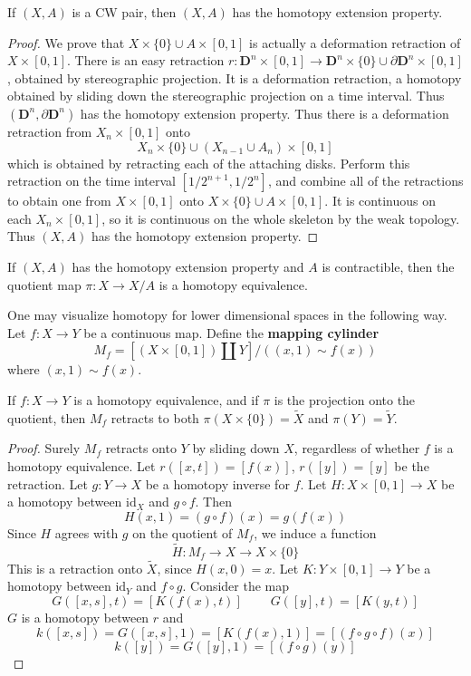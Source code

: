 \begin{theorem}
    If $(X,A)$ is a CW pair, then $(X,A)$ has the homotopy extension property.
\end{theorem}
\begin{proof}
    We prove that $X \times \{ 0 \} \cup A \times [0,1]$ is actually a deformation retraction of $X \times [0,1]$. There is an easy retraction $r: \mathbf{D}^n \times [0,1] \to \mathbf{D}^n \times \{ 0 \} \cup \partial \mathbf{D}^n \times [0,1]$, obtained by stereographic projection. It is a deformation retraction, a homotopy obtained by sliding down the stereographic projection on a time interval. Thus $(\mathbf{D}^n, \partial \mathbf{D}^n)$ has the homotopy extension property. Thus there is a deformation retraction from $X_n \times [0,1]$ onto
    \[ X_n \times \{ 0 \} \cup (X_{n-1} \cup A_n) \times [0,1] \]
    which is obtained by retracting each of the attaching disks. Perform this retraction on the time interval $[1/2^{n+1}, 1/2^n]$, and combine all of the retractions to obtain one from $X \times [0,1]$ onto $X \times \{ 0 \} \cup A \times [0,1]$. It is continuous on each $X_n \times [0,1]$, so it is continuous on the whole skeleton by the weak topology. Thus $(X, A)$ has the homotopy extension property.
\end{proof}

\begin{theorem}
    If $(X,A)$ has the homotopy extension property and $A$ is contractible, then the quotient map $\pi:X \to X/A$ is a homotopy equivalence.
\end{theorem}

\newpage

One may visualize homotopy for lower dimensional spaces in the following way. Let $f:X \to Y$ be a continuous map. Define the {\bf mapping cylinder}
%
\[ M_f = \left[(X \times [0,1]) \coprod Y\right] / ((x,1) \sim f(x)) \]
%
where $(x,1) \sim f(x)$.

\begin{lemma}
    If $f: X \to Y$ is a homotopy equivalence, and if $\pi$ is the projection onto the quotient, then $M_f$ retracts to both $\pi(X \times \{0\}) = \tilde{X}$ and $\pi(Y) = \tilde{Y}$.
\end{lemma}
\begin{proof}
    Surely $M_f$ retracts onto $Y$ by sliding down $X$, regardless of whether $f$ is a homotopy equivalence. Let $r([x,t]) = [f(x)]$, $r([y]) = [y]$ be the retraction. Let $g: Y \to X$ be a homotopy inverse for $f$. Let $H: X \times [0,1] \to X$ be a homotopy between $\text{id}_X$ and $g \circ f$. Then
    \[ H(x,1) = (g \circ f)(x) = g(f(x)) \]
    Since $H$ agrees with $g$ on the quotient of $M_f$, we induce a function
    \[ \tilde{H}: M_f \to X \to X \times \{ 0 \} \]
    This is a retraction onto $\tilde{X}$, since $H(x,0) = x$. Let $K: Y \times [0,1] \to Y$ be a homotopy between $\text{id}_Y$ and $f \circ g$. Consider the map
    \[ G([x,s], t) = [K(f(x), t)]\ \ \ \ \ \ \ \ \ \ G([y],t) = [K(y,t)] \]
    $G$ is a homotopy between $r$ and
    \[ k([x,s]) = G([x,s],1) = [K(f(x),1)] = [(f \circ g \circ f)(x)] \]
    \[ k([y]) = G([y],1) = [(f \circ g)(y)] \]
\end{proof}

